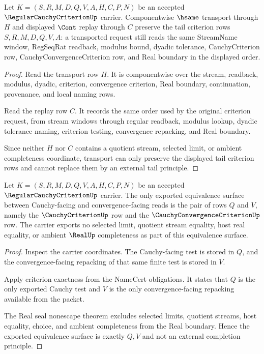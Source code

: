 \begin{theorem}
\label{thm:regular-cauchy-criterion-tail-transport}
Let $K=(S,R,M,D,Q,V,A,H,C,P,N)$ be an accepted $\RegularCauchyCriterionUp$ carrier. Componentwise $\hsame$ transport through $H$ and displayed $\Cont$ replay through $C$ preserve the tail criterion rows $S,R,M,D,Q,V,A$: a transported request still reads the same StreamName window, RegSeqRat readback, modulus bound, dyadic tolerance, CauchyCriterion row, CauchyConvergenceCriterion row, and Real boundary in the displayed order.
\end{theorem}
\begin{proof}
Read the transport row $H$. It is componentwise over the stream, readback, modulus, dyadic, criterion, convergence criterion, Real boundary, continuation, provenance, and local naming rows.

Read the replay row $C$. It records the same order used by the original criterion request, from stream windows through regular readback, modulus lookup, dyadic tolerance naming, criterion testing, convergence repacking, and Real boundary.

Since neither $H$ nor $C$ contains a quotient stream, selected limit, or ambient completeness coordinate, transport can only preserve the displayed tail criterion rows and cannot replace them by an external tail principle.
\end{proof}

\begin{theorem}
\label{thm:regular-cauchy-criterion-cauchy-equivalence}
Let $K=(S,R,M,D,Q,V,A,H,C,P,N)$ be an accepted $\RegularCauchyCriterionUp$ carrier. The only exported equivalence surface between Cauchy-facing and convergence-facing reads is the pair of rows $Q$ and $V$, namely the $\CauchyCriterionUp$ row and the $\CauchyConvergenceCriterionUp$ row. The carrier exports no selected limit, quotient stream equality, host real equality, or ambient $\RealUp$ completeness as part of this equivalence surface.
\end{theorem}
\begin{proof}
Inspect the carrier coordinates. The Cauchy-facing test is stored in $Q$, and the convergence-facing repacking of that same finite test is stored in $V$.

Apply criterion exactness from the NameCert obligations. It states that $Q$ is the only exported Cauchy test and $V$ is the only convergence-facing repacking available from the packet.

The Real seal nonescape theorem excludes selected limits, quotient streams, host equality, choice, and ambient completeness from the Real boundary. Hence the exported equivalence surface is exactly $Q,V$ and not an external completion principle.
\end{proof}

